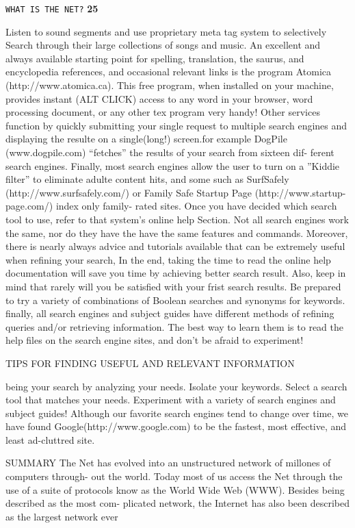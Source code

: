 \documentclass{book}
\begin{document}
\begin{flushleft}
\texttt{WHAT IS THE NET?}
\hspace*{0.5cm}
\textbf{25}
\vspace*{0.7cm}

Listen to sound segments and use proprietary meta tag system to selectively
Search through their large collections of songs and music.
 An excellent and always available starting point for spelling, translation, the 
saurus, and encyclopedia references, and occasional relevant links is the program
Atomica (http://www.atomica.ca). This free program, when installed on your
machine, provides instant (ALT CLICK) access to any word in your browser,
word processing document, or any other tex program very handy!
Other services function by quickly submitting your single request to multiple
search engines and displaying the resulte on a single(long!) screen.for example
DogPile (www.dogpile.com) “fetches” the results of your search from sixteen dif-
ferent search engines. 
Finally, most search engines allow the user to turn on a ”Kiddie filter” to eliminate
adulte content hits, and some such as SurfSafely (http://www.surfsafely.com/)
or Family Safe Startup Page (http://www.startup-page.com/) index only family-
rated sites. 
Once you have decided which search tool to use, refer to that system’s online help Section. 
Not all search engines work the same, nor do they have the have the same features and
commands. Moreover, there is nearly always advice and tutorials available that can be 
extremely useful when refining your search, In the end, taking the time to read the 
online help documentation will save you time by achieving better search result. Also, 
keep in mind that rarely will you be satisfied with your frist search results. Be prepared 
to try a variety of combinations of Boolean searches and synonyms for keywords.
finally, all search engines and subject guides have different methods of refining queries 
and/or retrieving information. The best way to learn them is to read the help files on 
the search engine sites, and don’t be afraid to experiment!

TIPS FOR FINDING USEFUL AND RELEVANT INFORMATION

being your search by analyzing your needs. 
Isolate your keywords. 
Select a search tool that matches your needs. 
Experiment with a variety of search engines and subject guides! 
Although our favorite search engines tend to change over time, we have found Google(http://www.google.com) to be the fastest, most effective, and least ad-cluttred site. 

SUMMARY 
The Net has evolved into an unstructured network of millones of computers through- out the world. Today most of us access the Net through the use of a suite of protocols know as the
World Wide Web (WWW). Besides being described as the most com- plicated network, the Internet has also been described as the largest network ever

\end{flushleft}
\end{document}
